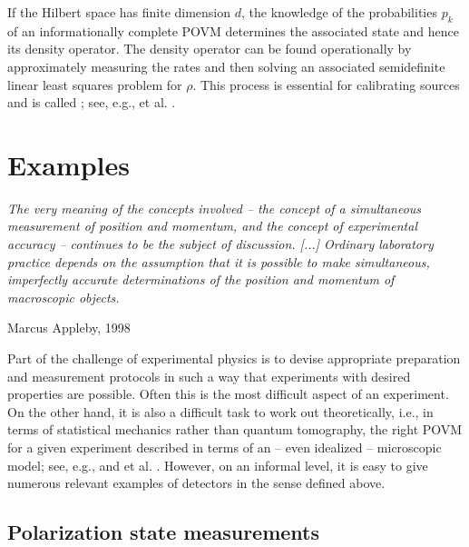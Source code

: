 \documentclass[12pt]{article}
\begin{document}
If the Hilbert space has finite dimension $d$, the knowledge of the
probabilities $p_k$ of an informationally complete POVM determines
the associated state and hence its density operator. The density
operator can be found operationally by approximately measuring the rates
and then solving an associated semidefinite linear least squares
problem for $\rho$. This process is essential for calibrating sources
and is called ; see, e.g.,
 et al. \cite{JezFH}.













\section{Examples}\label{s.ex}

\nopagebreak
\hfill\parbox[t]{10.8cm}{\footnotesize

{\em The very meaning of the concepts involved -- the concept of a
simultaneous measurement of position and momentum, and the concept of
experimental accuracy -- continues to be the subject of discussion.
[...]
Ordinary laboratory practice depends on the assumption that it is
possible to make simultaneous, imperfectly accurate determinations of
the position and momentum of macroscopic objects.}

\hfill Marcus Appleby, 1998 \cite{App1998}
}

\bigskip

Part of the challenge of experimental physics is to devise appropriate
preparation and measurement protocols in such a way that experiments
with desired properties are possible.
Often this is the most difficult aspect of an experiment.
On the other hand, it is also a difficult task to work out
theoretically, i.e., in terms of statistical mechanics rather than
quantum tomography, the right POVM for a given experiment described in
terms of an -- even idealized -- microscopic model; see, e.g.,
 \cite{BreP.QC} and
 et al. \cite{AllBN1}.
However, on an informal level, it is easy to give numerous relevant
examples of detectors in the sense defined above.


\subsection{Polarization state measurements}\label{ss.pol}
\end{document}

